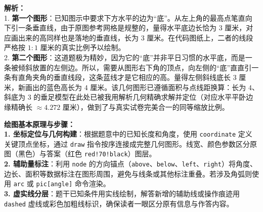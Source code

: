 \documentclass[12pt, a4paper]{ctexrep}
\begin{document}
\begin{center}
\end{center}

\vspace{0.6cm}
{\small\color{gray}
\textbf{解析：}\\
1. \textbf{第一个图形}：已知图示中要求下方水平的边为“底”。从左上角的最高点笔直向下引一条垂直线，由于原图参考网格是规整的，量得水平底边长恰为 $3$ 厘米，对应画出来的高同样也是落地的垂直线，长为 $3$ 厘米。在代码图纸上，二者的线段严格按 $1:1$ 厘米的真实比例予以绘制。\\
2. \textbf{第二个图形}：这道题极为精妙，因为它的“底”并非平日习惯的水平底，而是一条被倾斜放置的左侧边。所以，需要从图形右下角的顶点，向左侧的“底”直直引一条有直角夹角的垂直线段，这条蓝线才是它相应的高。量得左侧斜线底长 $3$ 厘米，新画出的蓝色高长为 $4$ 厘米。该几何图形已遵循面积与点线距换算：长为 $4$、斜底为 $3$ 的垂足模型在此处已被我用解析几何精确求解并定位（对应水平平卧边缘精确长 $\approx 4.272$ 厘米），做到了与真实试卷完美合一的同等缩放比例。
}


\vspace{0.6cm}

{\small\color{blue!70!black}
\textbf{绘图基本原理与步骤：}\\
\textbf{1. 坐标定位与几何构建}：根据题意中的已知长度和角度，使用 \texttt{coordinate} 定义关键顶点坐标，通过 \texttt{draw} 指令按序连接成完整几何图形。线宽、颜色参数区分原图（黑色）与答案（红色 \texttt{red!70!black}）图层。\\
\textbf{2. 辅助量标注}：利用 \texttt{node} 的方向锚点（\texttt{above}、\texttt{below}、\texttt{left}、\texttt{right}）将角度、边长、面积等数据标注在图形周围，避免与线条或其他标注重叠。若涉及角弧则使用 \texttt{arc} 或 \texttt{pic[angle]} 命令渲染。\\
\textbf{3. 虚实线分层}：题干已知条件用实线绘制，解答新增的辅助线或操作痕迹用 \texttt{dashed} 虚线或彩色加粗线标识，确保读者一眼区分原有信息与作答内容。
}
\end{document}
